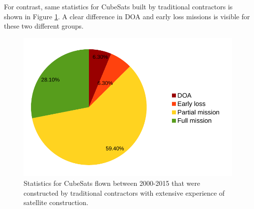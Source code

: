 \documentclass[english,12pt,a4paper,pdftex,elec,utf8]{aaltothesis}
\begin{document}
For contrast, same statistics for CubeSats built by traditional contractors is shown in Figure \ref{tradiotionalflown2015pic}. A clear difference in DOA and early loss missions is visible for these two different groups.\par
\begin{figure}[h!]
\centering
\includegraphics[scale=0.5]{traditional2015}
\caption{Statistics for CubeSats flown between 2000-2015 that were constructed by traditional contractors with extensive experience of satellite construction. \cite{Swart2016}}
\label{tradiotionalflown2015pic}
\end{figure} 
\end{document}
